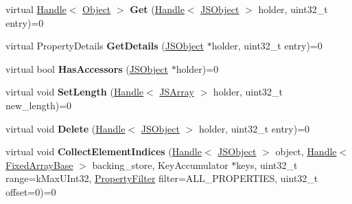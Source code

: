 \begin{DoxyCompactItemize}
\item 
virtual \hyperlink{classv8_1_1internal_1_1_handle}{Handle}$<$ \hyperlink{classv8_1_1internal_1_1_object}{Object} $>$ {\bfseries Get} (\hyperlink{classv8_1_1internal_1_1_handle}{Handle}$<$ \hyperlink{classv8_1_1internal_1_1_j_s_object}{J\+S\+Object} $>$ holder, uint32\+\_\+t entry)=0\hypertarget{classv8_1_1internal_1_1_elements_accessor_a4941141f96048d565af369dc674b1916}{}\label{classv8_1_1internal_1_1_elements_accessor_a4941141f96048d565af369dc674b1916}

\item 
virtual Property\+Details {\bfseries Get\+Details} (\hyperlink{classv8_1_1internal_1_1_j_s_object}{J\+S\+Object} $\ast$holder, uint32\+\_\+t entry)=0\hypertarget{classv8_1_1internal_1_1_elements_accessor_a8dd4fc7621761fb78bef5a5092f2214e}{}\label{classv8_1_1internal_1_1_elements_accessor_a8dd4fc7621761fb78bef5a5092f2214e}

\item 
virtual bool {\bfseries Has\+Accessors} (\hyperlink{classv8_1_1internal_1_1_j_s_object}{J\+S\+Object} $\ast$holder)=0\hypertarget{classv8_1_1internal_1_1_elements_accessor_ae12bc20cb4f11a7b844f6fd9bdee4879}{}\label{classv8_1_1internal_1_1_elements_accessor_ae12bc20cb4f11a7b844f6fd9bdee4879}

\item 
virtual void {\bfseries Set\+Length} (\hyperlink{classv8_1_1internal_1_1_handle}{Handle}$<$ \hyperlink{classv8_1_1internal_1_1_j_s_array}{J\+S\+Array} $>$ holder, uint32\+\_\+t new\+\_\+length)=0\hypertarget{classv8_1_1internal_1_1_elements_accessor_a8d1b3c1a8895fd7969476d6ea5a6900a}{}\label{classv8_1_1internal_1_1_elements_accessor_a8d1b3c1a8895fd7969476d6ea5a6900a}

\item 
virtual void {\bfseries Delete} (\hyperlink{classv8_1_1internal_1_1_handle}{Handle}$<$ \hyperlink{classv8_1_1internal_1_1_j_s_object}{J\+S\+Object} $>$ holder, uint32\+\_\+t entry)=0\hypertarget{classv8_1_1internal_1_1_elements_accessor_a8d3fe7d116744f4717a0338469f4555a}{}\label{classv8_1_1internal_1_1_elements_accessor_a8d3fe7d116744f4717a0338469f4555a}

\item 
virtual void {\bfseries Collect\+Element\+Indices} (\hyperlink{classv8_1_1internal_1_1_handle}{Handle}$<$ \hyperlink{classv8_1_1internal_1_1_j_s_object}{J\+S\+Object} $>$ object, \hyperlink{classv8_1_1internal_1_1_handle}{Handle}$<$ \hyperlink{classv8_1_1internal_1_1_fixed_array_base}{Fixed\+Array\+Base} $>$ backing\+\_\+store, Key\+Accumulator $\ast$keys, uint32\+\_\+t range=k\+Max\+U\+Int32, \hyperlink{namespacev8_afbf02b6b1152a3e25d7bde90798209ac}{Property\+Filter} filter=A\+L\+L\+\_\+\+P\+R\+O\+P\+E\+R\+T\+I\+ES, uint32\+\_\+t offset=0)=0\hypertarget{classv8_1_1internal_1_1_elements_accessor_a4b311f65dcf05e69d91246e2cc5e080a}{}\label{classv8_1_1internal_1_1_elements_accessor_a4b311f65dcf05e69d91246e2cc5e080a}


\end{DoxyCompactItemize}

